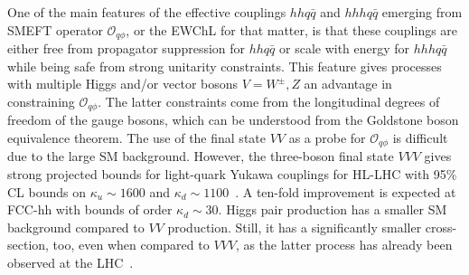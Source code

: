 \par One of the main features of the effective couplings $hh q\bar q$ and $hhh q\bar q$ emerging from SMEFT operator $\mathcal O_{q\phi}$, or the EWChL for that matter, is that these couplings are either free from propagator suppression for $hh q\bar q$ or scale with energy for $hhh q\bar q$ while being safe from strong unitarity constraints. This feature gives processes with multiple Higgs and/or vector bosons $V= W^\pm, Z$ an advantage in constraining $\mathcal O_{q\phi}$. The latter constraints come from the longitudinal degrees of freedom of the gauge bosons, which can be understood from the Goldstone boson equivalence theorem. The use of the final state $VV$ as a probe for $\mathcal O_{q\phi}$ is difficult due to the large SM background. However, the three-boson final state $VVV$ gives strong projected bounds for light-quark Yukawa couplings for HL-LHC with 95\% CL bounds on $\kappa_u \sim 1600$ and $\kappa_d\sim 1100$~\cite{Falkowski:2020znk}. A ten-fold improvement is expected at FCC-hh with bounds of order $\kappa_d\sim 30$. 
Higgs pair production has a smaller SM background compared to $VV$ production. Still, it has a significantly smaller cross-section, too, even when compared to $VVV$, as the latter process has already been observed at the LHC~\cite{Sciandra:2688061,CMS-PAS-SMP-19-014}.

